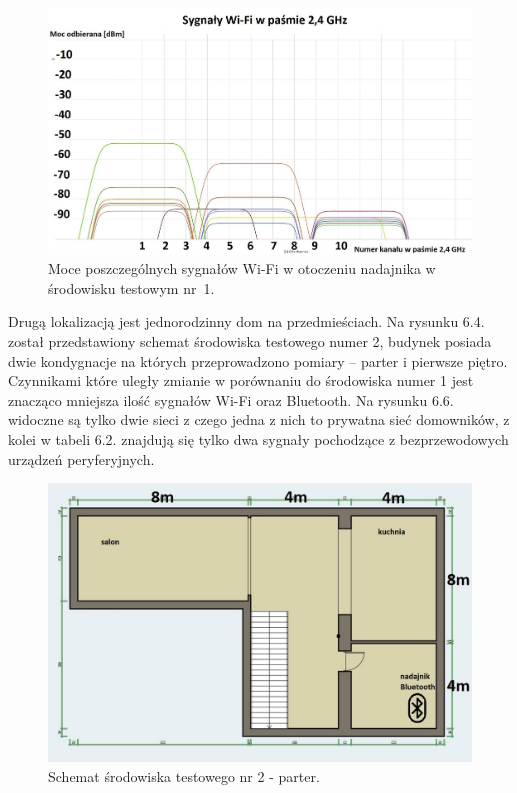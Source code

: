 \documentclass[12pt, twoside, openany]{mwrep}
\begin{document}
\begin{figure}[H]
\centering
\includegraphics[width=\textwidth]{2,4Ghz}
\caption{Moce poszczególnych sygnałów Wi-Fi w otoczeniu nadajnika w środowisku testowym nr~1.}
\end{figure}
\par
Drugą lokalizacją jest jednorodzinny dom na przedmieściach. Na rysunku 6.4. został przedstawiony schemat środowiska testowego numer 2, budynek posiada dwie kondygnacje na których przeprowadzono pomiary – parter i pierwsze piętro. Czynnikami które uległy zmianie w porównaniu do środowiska numer 1 jest znacząco mniejsza ilość sygnałów Wi-Fi oraz Bluetooth. Na rysunku 6.6. widoczne są tylko dwie sieci z czego jedna z nich to prywatna sieć domowników, z kolei w tabeli 6.2. znajdują się tylko dwa sygnały pochodzące z bezprzewodowych urządzeń peryferyjnych.
\par
\begin{figure}[H]
\centering
\includegraphics[width=\textwidth]{dom1pietro}
\caption{Schemat środowiska testowego nr 2 - parter.}
\end{figure}
\end{document}
